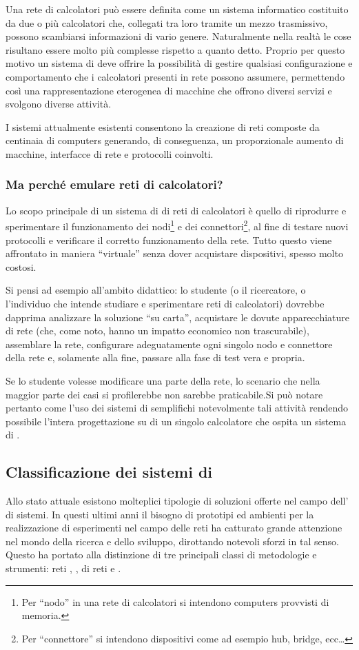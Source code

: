 Una rete di calcolatori può essere definita come un sistema informatico costituito da due o più calcolatori che, collegati tra loro tramite un mezzo trasmissivo, possono scambiarsi informazioni di vario genere. Naturalmente nella realtà le cose risultano essere molto più complesse rispetto a quanto detto. Proprio per questo motivo un sistema di \emulazione{} deve offrire la possibilità di gestire qualsiasi configurazione e comportamento che i calcolatori presenti in rete possono assumere, permettendo così una rappresentazione eterogenea di macchine che offrono diversi servizi e svolgono diverse attività.

I sistemi attualmente esistenti consentono la creazione di reti composte da centinaia di computers generando, di conseguenza, un proporzionale aumento di macchine, interfacce di rete e protocolli coinvolti.

\subsubsection{Ma perché emulare reti di calcolatori?}
Lo scopo principale di un sistema di \emulazione{} di reti di calcolatori è quello di riprodurre e sperimentare il funzionamento dei nodi\footnote{Per ``nodo'' in una rete di calcolatori si intendono computers provvisti di memoria.} e dei connettori\footnote{Per ``connettore'' si intendono dispositivi come ad esempio hub, bridge, ecc\ldots}, al fine di testare nuovi protocolli e verificare il corretto funzionamento della rete. Tutto questo viene affrontato in maniera ``virtuale'' senza dover acquistare dispositivi, spesso molto costosi.

Si pensi ad esempio all'ambito didattico: lo studente (o il ricercatore, o l'individuo che intende studiare e sperimentare reti di calcolatori) dovrebbe dapprima analizzare la soluzione ``su carta'', acquistare le dovute apparecchiature di rete (che, come noto, hanno un impatto economico non trascurabile), assemblare la rete, configurare adeguatamente ogni singolo nodo e connettore della rete e, solamente alla fine, passare alla fase di test vera e propria.

Se lo studente volesse modificare una parte della rete, lo scenario che nella maggior parte dei casi si profilerebbe non sarebbe praticabile.Si può notare pertanto come l'uso dei sistemi di \emulazione{} semplifichi notevolmente tali attività rendendo possibile l'intera progettazione su di un singolo calcolatore che ospita un sistema di \emulazione{}.


\subsection{Classificazione dei sistemi di \emulazione{}}
Allo stato attuale esistono molteplici tipologie di soluzioni offerte nel campo dell'\emulazione{} di sistemi. In questi ultimi anni il bisogno di prototipi ed ambienti per la realizzazione di esperimenti nel campo delle reti ha catturato grande attenzione nel mondo della ricerca e dello sviluppo, dirottando notevoli sforzi in tal senso. Questo ha portato alla distinzione di tre principali classi di metodologie e strumenti: reti \testbed{}, \simulazione{}, \emulazione{} di reti e \virtualmachine.

